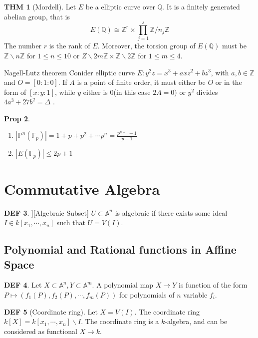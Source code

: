 \documentclass[twocolumn]{article}
\newcommand{\A}{\mathbb{A}}
\newcommand{\Z}{\mathbb{Z}}
\newcommand{\F}{\mathbb{F}}
\newcommand{\Q}{\mathbb{Q}}
\renewcommand{\P}{\mathbb{P}}
\theoremstyle{definition}
\newtheorem{thm}{THM}
\newtheorem{prop}[thm]{Prop}
\newtheorem{defi}[thm]{DEF}
\theoremstyle{remark}
\begin{document}
\begin{thm}[Mordell] 
	Let $E$ be a elliptic curve over $\Q$. It is a finitely generated abelian group, that is 
	$$
	E(\Q) \cong  \Z^r \times \prod_{j=1}^s \Z / n_j \Z
	$$
	The number $r$ is the rank of $E$.
	Moreover, the torsion group of $E(\Q)$ must be $\Z \backslash n\Z$ for $1 \leq n \leq 10$ or $Z \backslash 2m \Z \times \Z \backslash 2\Z$ for $1 \leq m \leq 4$.
\end{thm}

\begin{fthm}{Nagell-Lutz theorem}{}
	Conider elliptic curve $E: y^2z = x^3 + axz^2 + bz^3$, with $a, b \in \Z$ and $O = [0:1:0]$.
	If $A$ is a point of finite order, it must either be $O$ or in the form of $[x:y:1]$, while $y $ either is $0$(in this case $2A = 0$) or $y^2$ divides $4a^3 + 27b^2 = \Delta$ .
\end{fthm}

\begin{prop} 
	\begin{enumerate}
		\item $|\P^n(\F_p)| = 1 + p + p^2 + \cdots p^n = \frac{p^{n+1}-1}{p-1}$
		\item $|E(\F_p)| \leq 2p + 1$
	\end{enumerate}
\end{prop}

\section{Commutative Algebra}

\begin{defi}][Algebraic Subset]
	$U \subset \A^n$ is algebraic if there exists some ideal $I \in k[x_1, \cdots, x_n]$ such that $U = V(I)$.
\end{defi}

\subsection{Polynomial and Rational functions in Affine Space}

\begin{defi}
Let $X \subset \A^n, Y \subset \A^m$. 
A polynomial map $X \rightarrow Y$ is function of the form $P \mapsto (f_1(P), f_2(P), \cdots, f_m(P))$ for polynomials of $n$ variable $f_i$.
\end{defi}

\begin{defi}[Coordinate ring]
	Let $X = V(I)$. The coordinate ring $k[X] = k[x_1, \cdots, x_n ] \backslash I$. 
	The coordinate ring is a $k$-algebra, and can be considered as functional $X \rightarrow k$.
\end{defi}
\end{document}
